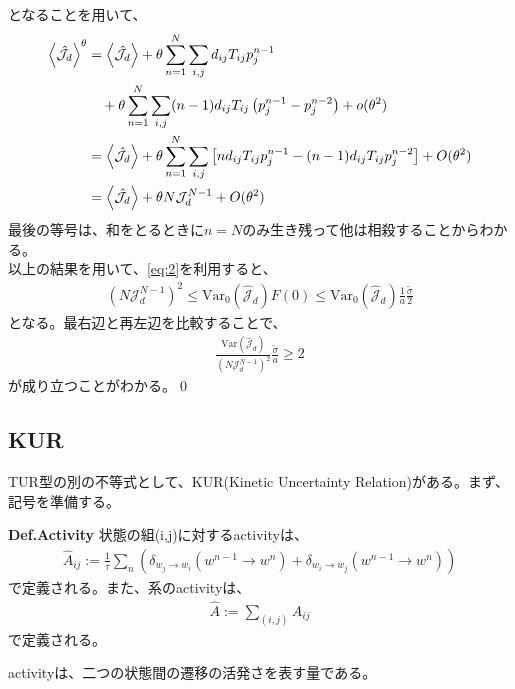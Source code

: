 \documentclass[a4paper,11pt]{jsarticle}
\numberwithin{equation}{section}
\begin{document}
となることを用いて、
\begin{align}
    \expval{\hat{\mathcal{J}}_d}^\theta 
    &= \expval{\hat{\mathcal{J}}_d} + \theta \sum_{n=1}^{N} \sum_{i,j} d_{ij} T_{ij} p_j^{n-1} \nonumber \\
    &\quad + \theta \sum_{n=1}^{N} \sum_{i,j} (n-1) d_{ij} T_{ij} \left(p_j^{n-1} - p_j^{n-2}\right) + o(\theta^2) \\
    &= \expval{\hat{\mathcal{J}}_d} + \theta \sum_{n=1}^{N} \sum_{i,j} \left[ n d_{ij} T_{ij} p_j^{n-1} - (n-1) d_{ij} T_{ij} p_j^{n-2} \right] + O(\theta^2) \\
    &= \expval{\hat{\mathcal{J}}_d} + \theta N \mathcal{J}_d^{N-1} + O(\theta^2)
\end{align}
最後の等号は、和をとるときに$n=N$のみ生き残って他は相殺することからわかる。\\

以上の結果を用いて、\eqref{eq:2}を利用すると、
\begin{align}
    (N \mathcal{J}_d^{N-1})^2 \leq \text{Var}_0(\hat{\mathcal{J}}_d) F(0) \leq \text{Var}_0(\hat{\mathcal{J}}_d) \frac{1}{a} \frac{\tilde{\sigma}}{2}
\end{align}
となる。最右辺と再左辺を比較することで、
\begin{align}
    \frac{\text{Var}(\hat{\mathcal{J}}_d)}{(N \mathcal{J}_d^{N-1})^2} \frac{\tilde{\sigma}}{a} \geq 2
\end{align}
が成り立つことがわかる。\qed

\subsection{KUR}
TUR型の別の不等式として、KUR(Kinetic Uncertainty Relation)がある。まず、記号を準備する。
\begin{itembox}[l]{\textbf{Def.Activity}}
    状態の組(i,j)に対するactivityは、
    \begin{align}
        \hat{A}_{ij} := \frac{1}{\tau} \sum_{n} \left( 
    \delta_{w_j \to w_i}(w^{n-1} \to w^n) + \delta_{w_i \to w_j}(w^{n-1} \to w^n) 
    \right)
    \end{align}
    で定義される。また、系のactivityは、
    \begin{align}
        \hat{A} := \sum_{(i,j)}  \hat{A}_{ij}
    \end{align}
    で定義される。
\end{itembox}
activityは、二つの状態間の遷移の活発さを表す量である。
\end{document}
